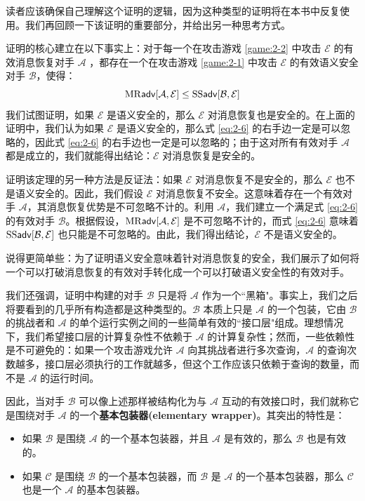 读者应该确保自己理解这个证明的逻辑，因为这种类型的证明将在本书中反复使用。我们再回顾一下该证明的重要部分，并给出另一种思考方式。

证明的核心建立在以下事实上：对于每一个在攻击游戏 \ref{game:2-2} 中攻击 $\mathcal{E}$ 的有效消息恢复对手 $\mathcal{A}$ ，都存在一个在攻击游戏 \ref{game:2-1} 中攻击 $\mathcal{E}$ 的有效语义安全对手 $\mathcal{B}$，使得：
\begin{equation}\label{eq:2-6}
{\rm MR\mathsf{adv}}[\mathcal{A},\mathcal{E}]\leq{\rm SS\mathsf{adv}}[\mathcal{B},\mathcal{E}]
\end{equation}
我们试图证明，如果 $\mathcal{E}$ 是语义安全的，那么 $\mathcal{E}$ 对消息恢复也是安全的。在上面的证明中，我们认为如果 $\mathcal{E}$ 是语义安全的，那么式 \ref{eq:2-6} 的右手边一定是可以忽略的，因此式 \ref{eq:2-6} 的右手边也一定是可以忽略的；由于这对所有有效对手 $\mathcal{A}$ 都是成立的，我们就能得出结论：$\mathcal{E}$ 对消息恢复是安全的。

证明该定理的另一种方法是反证法：如果 $\mathcal{E}$ 对消息恢复不是安全的，那么 $\mathcal{E}$ 也不是语义安全的。因此，我们假设 $\mathcal{E}$ 对消息恢复不安全。这意味着存在一个有效对手 $\mathcal{A}$，其消息恢复优势是不可忽略不计的。利用 $\mathcal{A}$，我们建立一个满足式 \ref{eq:2-6} 的有效对手 $\mathcal{B}$。根据假设，${\rm MR\mathsf{adv}}[\mathcal{A},\mathcal{E}]$ 是不可忽略不计的，而式 \ref{eq:2-6} 意味着 ${\rm SS\mathsf{adv}}[\mathcal{B},\mathcal{E}]$ 也只能是不可忽略的。由此，我们得出结论，$\mathcal{E}$ 不是语义安全的。

说得更简单些：为了证明语义安全意味着针对消息恢复的安全，我们展示了如何将一个可以打破消息恢复的有效对手转化成一个可以打破语义安全性的有效对手。

我们还强调，证明中构建的对手 $\mathcal{B}$ 只是将 $\mathcal{A}$ 作为一个``黑箱"。事实上，我们之后将要看到的几乎所有构造都是这种类型的。$\mathcal{B}$ 本质上只是 $\mathcal{A}$ 的一个包装，它由 $\mathcal{B}$ 的挑战者和 $\mathcal{A}$ 的单个运行实例之间的一些简单有效的``接口层"组成。理想情况下，我们希望接口层的计算复杂性不依赖于 $\mathcal{A}$ 的计算复杂性；然而，一些依赖性是不可避免的：如果一个攻击游戏允许 $\mathcal{A}$ 向其挑战者进行多次查询，$\mathcal{A}$ 的查询次数越多，接口层必须执行的工作就越多，但这个工作应该只依赖于查询的数量，而不是 $\mathcal{A}$ 的运行时间。

因此，当对手 $\mathcal{B}$ 可以像上述那样被结构化为与 $\mathcal{A}$ 互动的有效接口时，我们就称它是围绕对手 $\mathcal{A}$ 的一个\textbf{基本包装器(elementary wrapper)}。其突出的特性是：
\begin{itemize}
	\item 如果 $\mathcal{B}$ 是围绕 $\mathcal{A}$ 的一个基本包装器，并且 $\mathcal{A}$ 是有效的，那么 $\mathcal{B}$ 也是有效的。
	\item 如果 $\mathcal{C}$ 是围绕 $\mathcal{B}$ 的一个基本包装器，而 $\mathcal{B}$ 是 $\mathcal{A}$ 的一个基本包装器，那么 $\mathcal{C}$ 也是一个 $\mathcal{A}$ 的基本包装器。
\end{itemize}

